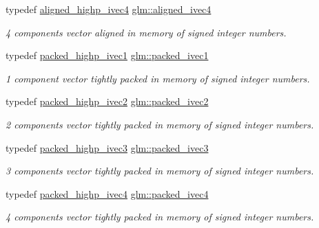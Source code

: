 \begin{DoxyCompactItemize}
typedef \mbox{\hyperlink{group__gtc__type__aligned_gabbac4883efc1760f4efb450753794f2d}{aligned\+\_\+highp\+\_\+ivec4}} \mbox{\hyperlink{group__gtc__type__aligned_gaa33169a30c7d22a8648f20b4534f635f}{glm\+::aligned\+\_\+ivec4}}
\begin{DoxyCompactList}\small\item\em 4 components vector aligned in memory of signed integer numbers. \end{DoxyCompactList}\item 
typedef \mbox{\hyperlink{group__gtc__type__aligned_ga7fde67656fb5726169114054992f0a3f}{packed\+\_\+highp\+\_\+ivec1}} \mbox{\hyperlink{group__gtc__type__aligned_gaed29e084c549e66663667ea4127b30a5}{glm\+::packed\+\_\+ivec1}}
\begin{DoxyCompactList}\small\item\em 1 component vector tightly packed in memory of signed integer numbers. \end{DoxyCompactList}\item 
typedef \mbox{\hyperlink{group__gtc__type__aligned_gae362d70a8be88cc43b6c1ec0992e73db}{packed\+\_\+highp\+\_\+ivec2}} \mbox{\hyperlink{group__gtc__type__aligned_gabc173f3a8e93f2970df6704371541da1}{glm\+::packed\+\_\+ivec2}}
\begin{DoxyCompactList}\small\item\em 2 components vector tightly packed in memory of signed integer numbers. \end{DoxyCompactList}\item 
typedef \mbox{\hyperlink{group__gtc__type__aligned_ga56b9f0123506edc416bbcf957d3ce678}{packed\+\_\+highp\+\_\+ivec3}} \mbox{\hyperlink{group__gtc__type__aligned_gae3121f35a569fd14475ff5f4d28bd98e}{glm\+::packed\+\_\+ivec3}}
\begin{DoxyCompactList}\small\item\em 3 components vector tightly packed in memory of signed integer numbers. \end{DoxyCompactList}\item 
typedef \mbox{\hyperlink{group__gtc__type__aligned_gabf988b7dc66612bc1d4c9ce44d5b5642}{packed\+\_\+highp\+\_\+ivec4}} \mbox{\hyperlink{group__gtc__type__aligned_gaf87b2eccca075255f5ed368dfb1ecc31}{glm\+::packed\+\_\+ivec4}}
\begin{DoxyCompactList}\small\item\em 4 components vector tightly packed in memory of signed integer numbers. \end{DoxyCompactList}\item 

\end{DoxyCompactItemize}
